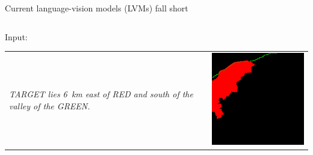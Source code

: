 \documentclass[14pt,aspectratio=169]{beamer}
\begin{document}
\begin{frame}{Current language-vision models (LVMs) fall short}
\begin{columns}
\begin{column}{0.48\textwidth}
Input: \\
\smallskip
\begin{tabular}{ p{} l @{}}
\textit{TARGET lies 6 km east of RED and south of the valley of the GREEN.} &
\includegraphics[align=t,width=.25\textwidth]{compgeo/GL006_046_oracle_input.png}
\end{tabular}


\end{column}
\end{columns}
\end{frame}
\end{document}

